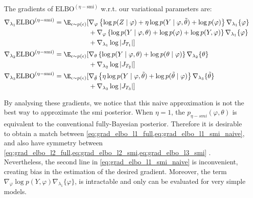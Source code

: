 The gradients of $\text{ELBO}^{(\eta-\text{smi})}$ w.r.t. our variational parameters are:
\begin{align}
  \nabla_{\lambda_1} \text{ELBO}^{(\eta-\text{smi})} = \E_{\epsilon \sim p(\epsilon)}[ & \nabla_{\varphi} \left\{ \log p(Z \mid \varphi) + \eta \log p(Y \mid \varphi, \tilde\theta) + \log p(\varphi) \right\} \nabla_{\lambda_1} \{ \varphi \} \nonumber    \\
                                                                                       & + \nabla_{\varphi} \left\{ \log p(Y \mid \varphi, \theta) + \log p(\varphi) + \log p(Y, \varphi) \right\} \nabla_{\lambda_1} \{ \varphi \} \nonumber                 \\
                                                                                       & + \nabla_{\lambda_1} \log \left| J_{T_1} \right| ] \label{eq:grad_elbo_l1_smi_naive}                                                                                 \\
  \nabla_{\lambda_2} \text{ELBO}^{(\eta-\text{smi})} = \E_{\epsilon \sim p(\epsilon)}[ & \nabla_{\theta} \left\{ \log p(Y \mid \varphi, \theta) + \log p(\theta \mid \varphi) \right\} \nabla_{\lambda_2} \{ \theta \} \nonumber                              \\
                                                                                       & + \nabla_{\lambda_2} \log \left| J_{T_2} \right| ] \label{eq:grad_elbo_l2_smi}                                                                                       \\
  \nabla_{\lambda_3} \text{ELBO}^{(\eta-\text{smi})} = \E_{\epsilon \sim p(\epsilon)}[ & \nabla_{\tilde\theta} \left\{ \eta \log p(Y \mid \varphi, \tilde\theta) + \log p(\tilde\theta \mid \varphi) \right\} \nabla_{\lambda_3} \{ \tilde\theta \} \nonumber \\
                                                                                       & + \nabla_{\lambda_3} \log \left| J_{T_3} \right| ] \label{eq:grad_elbo_l3_smi}
\end{align}

By analysing these gradients, we notice that this naive approximation is not the best way to approximate the \acrshort*{smi} posterior.
When $\eta=1$, the $p_{\eta-smi}(\varphi,\theta)$ is equivalent to the conventional fully-Bayesian posterior.
Therefore it is desirable to obtain a match between \cref{eq:grad_elbo_l1_full,eq:grad_elbo_l1_smi_naive}, and also have symmetry between \cref{eq:grad_elbo_l2_full,eq:grad_elbo_l2_smi,eq:grad_elbo_l3_smi} .
Nevertheless, the second line in \cref{eq:grad_elbo_l1_smi_naive} is inconvenient, creating bias in the estimation of the desired gradient.
Moreover, the term $\nabla_{\varphi} \log p(Y, \varphi) \nabla_{\lambda_1} \{ \varphi \}$, is intractable and only can be evaluated for very simple models.

